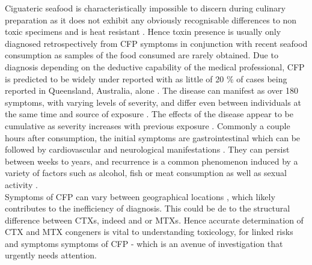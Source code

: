 \documentclass[12pt]{article}
\begin{document}
Ciguateric seafood is characteristically impossible to discern during culinary preparation as it does not exhibit any obviously recognisable differences to non toxic specimens and is heat resistant \cite{withers1982ciguatera}. Hence toxin presence is usually only diagnosed retrospectively from CFP symptoms in conjunction with recent seafood consumption \cite{sims1987theoretical} as samples of the food consumed are rarely obtained. Due to diagnosis depending on the deductive capability of the medical professional, CFP is predicted to be widely under reported with as little of 20 \% of cases being reported  in Queensland, Australia, alone \cite{lewis2006ciguatera}. The disease can manifest as over 180 symptoms, with varying levels of severity, and differ even between individuals at the same time and source of exposure \cite{sims1987theoretical}. The effects of the disease appear to be cumulative as severity increases with previous exposure \cite{emerson1983preliminary}. Commonly a couple hours after consumption, the initial symptoms are gastrointestinal which can be followed by cardiovascular and neurological manifestations \cite{sims1987theoretical}. They can persist between weeks to years, and recurrence is a common phenomenon induced by a variety of factors such as alcohol, fish or meat consumption \cite{lewis2006ciguatera} as well as sexual activity \cite{lange1992travel}. \\
Symptoms of CFP can vary between geographical locations \cite{molgo2000ciguatera,dickey2010ciguatera}, which likely contributes to the inefficiency of diagnosis. This could be de to the structural difference between CTXs, indeed and or MTXs. Hence accurate determination of CTX and MTX congeners is vital to understanding toxicology, for linked risks and symptoms symptoms of CFP - which is an avenue of investigation that urgently needs attention.\\
\end{document}
